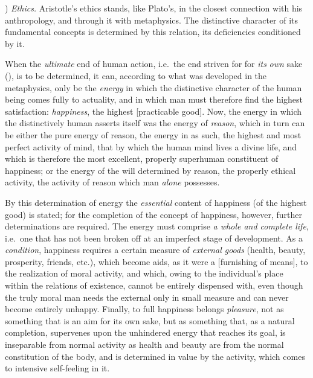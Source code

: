 ) \emph{Ethics.} Aristotle's ethics stands, like Plato's,
in the closest connection with his anthropology, and through
it with metaphysics. The distinctive character of its fundamental concepts is determined by this relation, its deficiencies conditioned
by it.

When the \emph{ultimate} end of human action, i.e.\ the end striven for for \emph{its}
\emph{own} sake (), is to be determined, it can, according to what was developed in the metaphysics, only be the \emph{energy} in which the
distinctive character of the human being comes fully
to actuality, and in which man must therefore find the
highest satisfaction: \emph{happiness}, the highest  [practicable good]. Now, the energy in which the distinctively
human asserts itself was the energy of \emph{reason},
which in turn can be either the pure energy of reason, the energy
in  as such, the highest and most perfect activity of mind, that by which the human mind lives a divine
life, and which is therefore the most excellent, properly
superhuman constituent of happiness; or the energy of the will
determined by reason, the properly ethical activity, the activity of reason which man \emph{alone} possesses.

By this determination of energy the \emph{essential} content of happiness (of the
highest good) is stated; for the completion of the concept of happiness, however, further
determinations are required. The energy must comprise \emph{a whole and complete life}, i.e.\ one that has not been broken off at an
imperfect stage of development. As a \emph{condition}, happiness requires a certain measure of \emph{external goods} (health, beauty,
prosperity, friends, etc.), which become aids, as it were a
 [furnishing of means], to the realization of moral activity, and which, owing to
the individual's place within the relations of existence, cannot be entirely
dispensed with, even though the truly moral man needs the external only in small measure
and can never become entirely unhappy.
Finally, to full happiness belongs \emph{pleasure}, not as
something that is an aim for its own sake, but as something
that, as a natural completion, supervenes upon the unhindered energy that
reaches its goal, is inseparable from normal activity as health and beauty are from the normal constitution of the body, and is determined in value by the activity, which
comes to intensive self-feeling in it.

